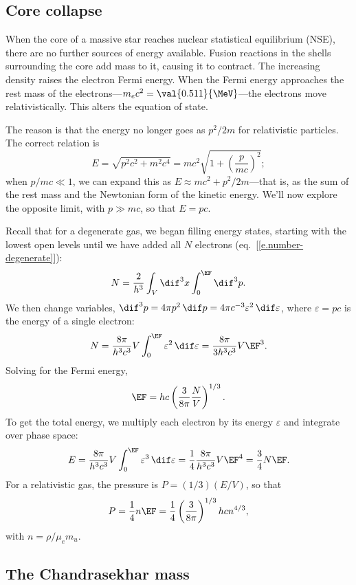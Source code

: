 \subsection{Core collapse}
When the core of a massive star reaches nuclear statistical equilibrium (NSE), there are no further sources of energy available. Fusion reactions in the shells surrounding the core add mass to it, causing it to contract. The increasing density raises the electron Fermi energy. When the Fermi energy approaches the rest mass of the electrons---$m_{e}c^{2} = \val{0.511}{\MeV}$---the electrons move relativistically. This alters the equation of state.

The reason is that the energy no longer goes as $p^{2}/2m$ for relativistic particles. The correct relation is
\[
	E = \sqrt{p^{2}c^{2} + m^{2}c^{4}} = mc^{2}\sqrt{1 + \left(\frac{p}{mc}\right)^{2}};
\]
when $p/mc\ll 1$, we can expand this as $E\approx m c^{2} + p^{2}/2m$---that is, as the sum of the rest mass and the Newtonian form of the kinetic energy. We'll now explore the opposite limit, with $p \gg mc$, so that $E = pc$.

Recall that for a degenerate gas, we began filling energy states, starting with the lowest open levels until we have added all $N$ electrons (eq.~[\ref{e.number-degenerate}]):
\[
	N = \frac{2}{h^{3}}\int_{V}\dif^{3}x\int_{0}^{\EF}\dif^{3}p.
\]
We then change variables, $\dif^{3}p = 4\pi p^{2}\,\dif p = 4\pi c^{-3}\varepsilon^{2}\,\dif\varepsilon$, where $\varepsilon = pc$ is the energy of a single electron:
\[
	N = \frac{8\pi}{h^{3}c^{3}}V \int_{0}^{\EF} \varepsilon^{2}\,\dif\varepsilon
	= \frac{8\pi}{3h^{3}c^{3}} V  \EF^{3}.
\]
Solving for the Fermi energy,
\[
	\EF = hc\left(\frac{3}{8\pi}\frac{N}{V}\right)^{1/3}.
\]
To get the total energy, we multiply each electron by its energy $\varepsilon$ and integrate over phase space:
\[
	E = \frac{8\pi}{h^{3}c^{3}}V\int_{0}^{\EF}\varepsilon^{3}\,\dif\varepsilon = 
		\frac{1}{4}\frac{8\pi}{h^{3}c^{3}}V\EF^{4} = \frac{3}{4}N\EF.
\]
For a relativistic gas, the pressure is $P = (1/3)(E/V)$, so that
\begin{equation}
\label{e.pressure-relativistic}
	P = \frac{1}{4}n\EF = \frac{1}{4}\left(\frac{3}{8\pi}\right)^{1/3}hc n^{4/3},
\end{equation}
with $n = \rho/\mu_{e}m_{u}$.

\subsection{The Chandrasekhar mass}

